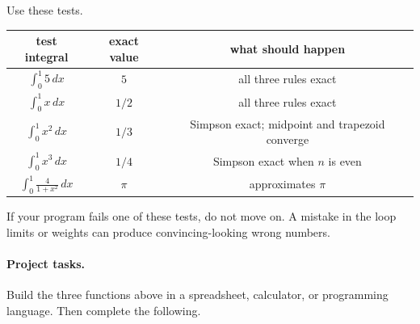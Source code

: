 Use these tests.

\begin{center}
\begin{tabular}{c|c|c}
\textbf{test integral} & \textbf{exact value} & \textbf{what should happen} \\ \hline
\(\displaystyle \int_0^1 5\,dx\) & \(5\) & all three rules exact \\[6pt]
\(\displaystyle \int_0^1 x\,dx\) & \(1/2\) & all three rules exact \\[6pt]
\(\displaystyle \int_0^1 x^2\,dx\) & \(1/3\) & Simpson exact; midpoint and trapezoid converge \\[6pt]
\(\displaystyle \int_0^1 x^3\,dx\) & \(1/4\) & Simpson exact when \(n\) is even \\[6pt]
\(\displaystyle \int_0^1 \frac{4}{1+x^2}\,dx\) & \(\pi\) & approximates \(\pi\)
\end{tabular}
\end{center}

If your program fails one of these tests, do not move on.  A mistake in the loop limits
or weights can produce convincing-looking wrong numbers.

\paragraph{Project tasks.}
Build the three functions above in a spreadsheet, calculator, or programming language.
Then complete the following.

